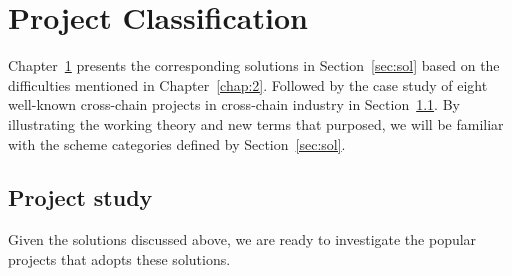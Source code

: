 \chapter{Project Classification} 
\label{chap:3}
\noindent Chapter~\ref{chap:3} presents the corresponding solutions in Section~\ref{sec:sol} based on the difficulties mentioned in Chapter~\ref{chap:2}. Followed by the case study of eight well-known cross-chain projects in cross-chain industry in Section~\ref{sec:ps}. By illustrating the working theory and new terms that purposed,  we will be familiar with the scheme categories defined by Section~\ref{sec:sol}.


\section{Project study}
\label{sec:ps}
\noindent Given the solutions discussed above, we are ready to investigate the popular projects that adopts these solutions.

